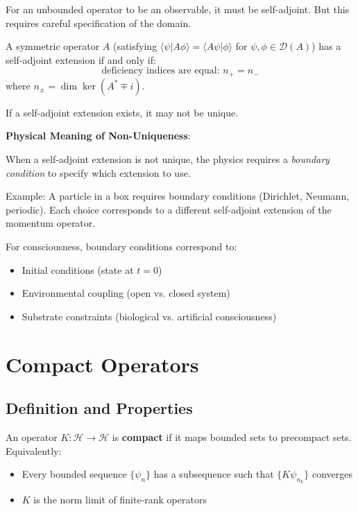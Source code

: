 For an unbounded operator to be an observable, it must be self-adjoint. But this requires careful specification of the domain.

\begin{theorem}\label{thm:self-adjoint-extension}
A symmetric operator $A$ (satisfying $\langle \psi | A\phi \rangle = \langle A\psi | \phi \rangle$ for $\psi, \phi \in \mathcal{D}(A)$) has a self-adjoint extension if and only if:
\begin{equation}
\text{deficiency indices are equal: } n_+ = n_-
\end{equation}
where $n_\pm = \dim \ker(A^* \mp i)$.

If a self-adjoint extension exists, it may not be unique.
\end{theorem}

\begin{level2}
\textbf{Physical Meaning of Non-Uniqueness}:

When a self-adjoint extension is not unique, the physics requires a \textit{boundary condition} to specify which extension to use.

Example: A particle in a box requires boundary conditions (Dirichlet, Neumann, periodic). Each choice corresponds to a different self-adjoint extension of the momentum operator.

For consciousness, boundary conditions correspond to:
\begin{itemize}
\item Initial conditions (state at $t=0$)
\item Environmental coupling (open vs. closed system)
\item Substrate constraints (biological vs. artificial consciousness)
\end{itemize}
\end{level2}

\section{Compact Operators}

\subsection{Definition and Properties}

\begin{definition}\label{def:compact-operator}
An operator $K: \mathcal{H} \to \mathcal{H}$ is \textbf{compact}\cite{reed1980,rudin1976} if it maps bounded sets to precompact sets. Equivalently:
\begin{itemize}
\item Every bounded sequence $\{\psi_n\}$ has a subsequence such that $\{K\psi_{n_k}\}$ converges
\item $K$ is the norm limit of finite-rank operators
\end{itemize}
\end{definition}

